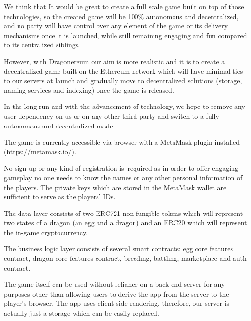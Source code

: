 \documentclass[12pt]{article}
\begin{document}
We think that It would be great to create a full scale game built on top of those technologies,  so the created game will be 100$\%$  autonomous and decentralized, and no party will have control over any element of the game or its delivery mechanisms once it is launched, while still remaining engaging and fun compared to its centralized siblings.\par

However, with Dragonereum our aim is more realistic and it is to create a decentralized game built on the Ethereum network which will have minimal ties to our servers at launch and gradually move to decentralized solutions (storage, naming services and indexing) once the game is released.\par

In the long run and with the advancement of technology, we hope to remove any user dependency on us or on any other third party and switch to a fully autonomous and decentralized mode.\par

The game is currently accessible via browser with a MetaMask plugin installed (\href{https://metamask.io/}{\textcolor[HTML]{1155CC}{\uline{https://metamask.io/}}}).\par

No sign up or any kind of registration is\ required as in order to offer engaging gameplay no one  needs to know the names or any other personal information of the players. The private keys which are stored in the MetaMask wallet are sufficient to serve as the players’ IDs.\par

The data layer consists of two ERC721  \cite{Ethereum_2017_Sep_26}  non-fungible tokens which will represent two states of a dragon (an egg and a dragon) and an ERC20  \cite{Ethereum_2015_Nov_19}  which will represent the in-game cryptocurrency. \par

The business logic layer consists of several smart contracts: egg core features contract, dragon core features contract, breeding, battling, marketplace and auth contract.\par

The game itself can be used without reliance on a back-end server for any purposes other than allowing users to derive the app from the server to the player’s browser. The app uses client-side rendering, therefore, our server is actually just a storage which can be easily replaced.\par
\end{document}
